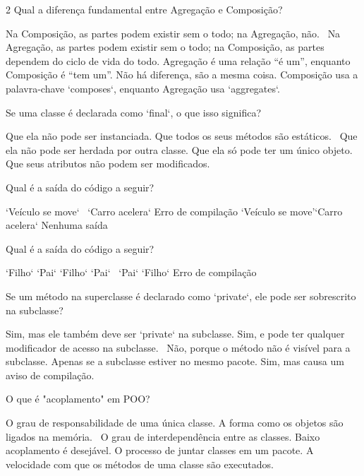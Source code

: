 \documentclass{exam}
\newcounter{solcount}
\newcommand\CC{\
    \CorrectChoice\label{sol:\arabic{solcount}}}
\begin{document}
\begin{questions}
\begin{multicols}{2}
\question[1] Qual a diferença fundamental entre Agregação e Composição?
\begin{choices}
 \choice Na Composição, as partes podem existir sem o todo; na Agregação, não.
 \CC Na Agregação, as partes podem existir sem o todo; na Composição, as partes dependem do ciclo de vida do todo.
 \choice Agregação é uma relação ``é um'', enquanto Composição é ``tem um''.
 \choice Não há diferença, são a mesma coisa.
 \choice Composição usa a palavra-chave `composes`, enquanto Agregação usa `aggregates`.
\end{choices}

\question[1] Se uma classe é declarada como `final`, o que isso significa?
\begin{choices}
 \choice Que ela não pode ser instanciada.
 \choice Que todos os seus métodos são estáticos.
 \CC Que ela não pode ser herdada por outra classe.
 \choice Que ela só pode ter um único objeto.
 \choice Que seus atributos não podem ser modificados.
\end{choices}

\question[1] Qual é a saída do código a seguir?

\begin{choices}
 \choice `Veículo se move`
 \CC `Carro acelera`
 \choice Erro de compilação
 \choice `Veículo se move'`Carro acelera`
 \choice Nenhuma saída
\end{choices}

\question[1] Qual é a saída do código a seguir?

\begin{choices}
 \choice `Filho`
 \choice `Pai`
 \choice `Filho` `Pai`
 \CC `Pai` `Filho`
 \choice Erro de compilação
\end{choices}

\question[1] Se um método na superclasse é declarado como `private`, ele pode ser sobrescrito na subclasse?
\begin{choices}
 \choice Sim, mas ele também deve ser `private` na subclasse.
 \choice Sim, e pode ter qualquer modificador de acesso na subclasse.
 \CC Não, porque o método não é visível para a subclasse.
 \choice Apenas se a subclasse estiver no mesmo pacote.
 \choice Sim, mas causa um aviso de compilação.
\end{choices}

\question[1] O que é "acoplamento" em POO?
\begin{choices}
 \choice O grau de responsabilidade de uma única classe.
 \choice A forma como os objetos são ligados na memória.
 \CC O grau de interdependência entre as classes. Baixo acoplamento é desejável.
 \choice O processo de juntar classes em um pacote.
 \choice A velocidade com que os métodos de uma classe são executados.
\end{choices}


\end{multicols}
\end{questions}
\end{document}
